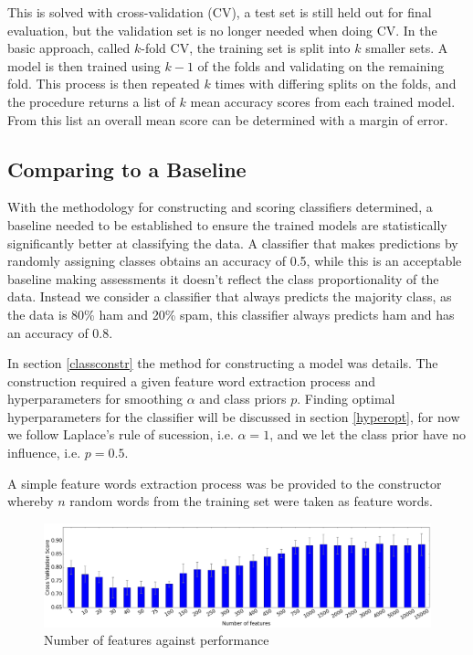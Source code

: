 \documentclass[12pt, a4paper]{article}
\begin{document}
  This is solved with cross-validation (CV), a test set is still held out for final evaluation, but the validation set is no longer needed when doing CV. In the basic approach, called $k$-fold CV, the training set is split into $k$ smaller sets. A model is then trained using $k-1$ of the folds and validating on the remaining fold. This process is then repeated $k$ times with differing splits on the folds, and the procedure returns a list of $k$ mean accuracy scores from each trained model. From this list an overall mean score can be determined with a margin of error.

  \subsection{Comparing to a Baseline} \label{baseline}

  With the methodology for constructing and scoring classifiers determined, a baseline needed to be established to ensure the trained models are statistically significantly better at classifying the data. A classifier that makes predictions by randomly assigning classes obtains an accuracy of 0.5, while this is an acceptable baseline making assessments it doesn't reflect the class proportionality of the data. Instead we consider a classifier that always predicts the majority class, as the data is 80\% ham and 20\% spam, this classifier always predicts ham and has an accuracy of 0.8.

  In section \ref{classconstr} the method for constructing a model was details. The construction required a given feature word extraction process and hyperparameters for smoothing $\alpha$ and class priors $p$. Finding optimal hyperparameters for the classifier will be discussed in section \ref{hyperopt}, for now we follow Laplace's rule of sucession, i.e. $\alpha = 1$, and we let the class prior have no influence, i.e. $p = 0.5$.

  A simple feature words extraction process was be provided to the constructor whereby $n$ random words from the training set were taken as feature words.


  \begin{figure}[H]
    \caption{Number of features against performance}
    \label{numfeatures}
    \includegraphics[width=1\textwidth]{report_images/num_features_vs_performance}
  \end{figure}
\end{document}

